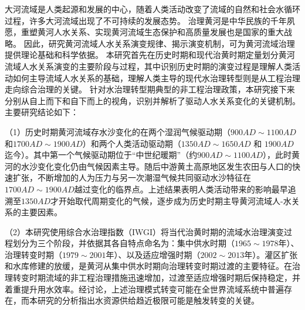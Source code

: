 \begin{cabstract}



大河流域是人类起源和发展的中心，随着人类活动改变了流域的自然和社会水循环过程，许多大河流域出现了不可持续的发展态势。
治理黄河是中华民族的千年夙愿，重塑黄河人水关系、实现黄河流域生态保护和高质量发展也是国家的重大战略。
因此，研究黄河流域人水关系演变规律、揭示演变机制，可为黄河流域治理提供理论基础和科学依据。
本研究首先在历史时期和现代治黄时期定量划分黄河流域人水关系演变的主要阶段与过程，其中识别历史时期的演变过程是理解人类活动如何主导流域人水关系的基础，理解人类主导的现代水治理转型则是从工程治理走向综合治理的关键。
针对水治理转型期典型的非工程治理政策，本研究接下来分别从自上而下和自下而上的视角，识别并解析了驱动人水关系变化的关键机制。主要研究结论如下：

（1）历史时期黄河流域存水沙变化的在两个湿润气候驱动期（$900AD\sim1100AD$和$1700AD\sim1900AD$）和两个人类活动驱动期（$1350AD \sim 1650AD$ 和 $1900AD$迄今）。其中第一个气候驱动期位于“中世纪暖期”（约$900AD \sim 1100AD$），此时黄河的水沙变化变化仍由气候因素主导。随后中游黄土高原地区发生农田与人口的快速扩张，不断增加的人为压力与另一次潮湿气候共同驱动水沙特征在$1700AD \sim 1900AD$越过变化的临界点。上述结果表明人类活动带来的影响最早追溯至$1350AD$才开始取代周期变化的气候，逐步成为历史时期主导黄河流域人-水关系的主要因素。

（2）本研究使用综合水治理指数（IWGI）将当代治黄时期的流域水治理演变过程划分为三个阶段，并依据其各自特点命名为：集中供水时期（$1965 \sim 1978$年）、治理转变时期（$1979 \sim 2001$年）、以及适应增强时期（$2002 \sim 2013$年）。灌区扩张和水库修建的放缓，是黄河从集中供水时期向治理转变时期过渡的主要特征。在治理转变时期流域的非工程治理措施迅速增加，过渡至适应增强时期后保持稳定，并着重提升用水效率。经讨论，上述治理模式转变可能在全世界流域系统中普遍存在，而本研究的分析指出水资源供给趋近极限可能是触发转变的关键。


\end{cabstract}
